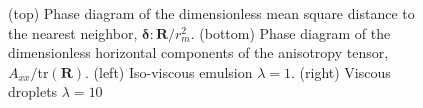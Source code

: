 \begin{figure}[h!]
    \caption{
        (top) Phase diagram of the dimensionless mean square distance to the nearest neighbor, $\bm\delta:\textbf{R}/r_m^2$.
        (bottom) Phase diagram of the dimensionless horizontal components of the anisotropy tensor, $A_{xx}/\text{tr}(\textbf{R})$.  
        (left) Iso-viscous emulsion $\lambda = 1$.
        (right) Viscous droplets $\lambda = 10$ }
    \label{fig:phase}
\end{figure}

